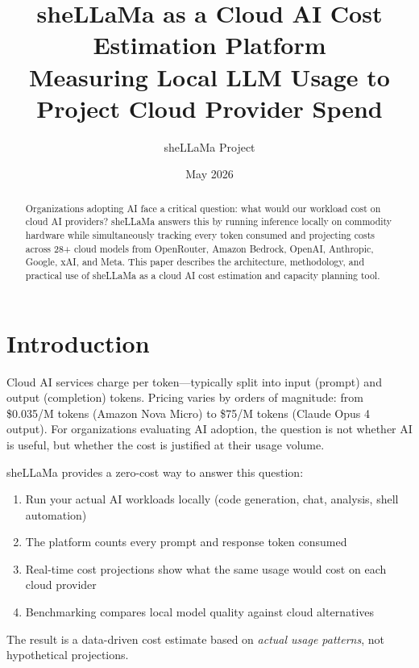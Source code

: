 \documentclass[11pt,a4paper]{article}
\title{\textbf{sheLLaMa as a Cloud AI Cost Estimation Platform}\\[4pt]\large Measuring Local LLM Usage to Project Cloud Provider Spend}
\author{sheLLaMa Project}
\date{May 2026}
\begin{document}
\maketitle
\thispagestyle{fancy}

\begin{abstract}
Organizations adopting AI face a critical question: what would our workload cost on cloud AI providers? sheLLaMa answers this by running inference locally on commodity hardware while simultaneously tracking every token consumed and projecting costs across 28+ cloud models from OpenRouter, Amazon Bedrock, OpenAI, Anthropic, Google, xAI, and Meta. This paper describes the architecture, methodology, and practical use of sheLLaMa as a cloud AI cost estimation and capacity planning tool.
\end{abstract}

\tableofcontents
\newpage

\section{Introduction}

Cloud AI services charge per token---typically split into input (prompt) and output (completion) tokens. Pricing varies by orders of magnitude: from \$0.035/M tokens (Amazon Nova Micro) to \$75/M tokens (Claude Opus 4 output). For organizations evaluating AI adoption, the question is not whether AI is useful, but whether the cost is justified at their usage volume.

sheLLaMa provides a zero-cost way to answer this question:

\begin{enumerate}
  \item Run your actual AI workloads locally (code generation, chat, analysis, shell automation)
  \item The platform counts every prompt and response token consumed
  \item Real-time cost projections show what the same usage would cost on each cloud provider
  \item Benchmarking compares local model quality against cloud alternatives
\end{enumerate}

The result is a data-driven cost estimate based on \emph{actual usage patterns}, not hypothetical projections.

\end{document}
